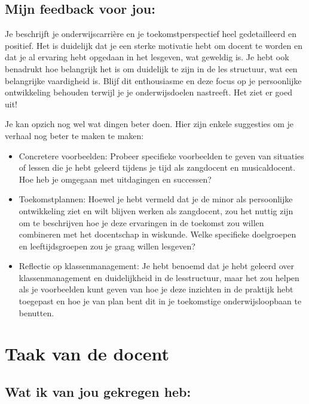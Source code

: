 \documentclass{article}
\begin{document}
        \bigskip

        \subsection{Mijn feedback voor jou:}

            Je beschrijft je onderwijscarrière en je toekomstperspectief heel gedetailleerd en positief. Het is duidelijk dat je een sterke motivatie hebt om docent te worden en dat je al ervaring hebt opgedaan in het lesgeven, wat geweldig is. Je hebt ook benadrukt hoe belangrijk het is om duidelijk te zijn in de les structuur, wat een belangrijke vaardigheid is. Blijf dit enthousiasme en deze focus op je persoonlijke ontwikkeling behouden terwijl je je onderwijsdoelen nastreeft. Het ziet er goed uit!
            
            Je kan opzich nog wel wat dingen beter doen. Hier zijn enkele suggesties om je verhaal nog beter te maken te maken:
            \begin{itemize}
                \item Concretere voorbeelden: Probeer specifieke voorbeelden te geven van situaties of lessen die je hebt geleerd tijdens je tijd als zangdocent en musicaldocent. Hoe heb je omgegaan met uitdagingen en successen?
                \item Toekomstplannen: Hoewel je hebt vermeld dat je de minor als persoonlijke ontwikkeling ziet en wilt blijven werken als zangdocent, zou het nuttig zijn om te beschrijven hoe je deze ervaringen in de toekomst zou willen combineren met het docentschap in wiskunde. Welke specifieke doelgroepen en leeftijdsgroepen zou je graag willen lesgeven?
                \item Reflectie op klassenmanagement: Je hebt benoemd dat je hebt geleerd over klassenmanagement en duidelijkheid in de lesstructuur, maar het zou helpen als je voorbeelden kunt geven van hoe je deze inzichten in de praktijk hebt toegepast en hoe je van plan bent dit in je toekomstige onderwijsloopbaan te benutten.
            \end{itemize}
    
    \newpage
    
    \section{Taak van de docent}

        \subsection{Wat ik van jou gekregen heb:}
\end{document}
